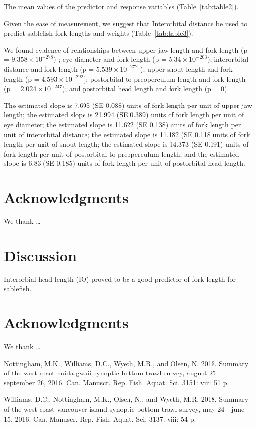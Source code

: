 \documentclass[12pt]{article}\usepackage[]{graphicx}\usepackage[]{color}
\begin{document}
The mean values of the predictor and response variables (Table~\ref{tab:table2}).

Given the ease of measurement, we suggest that Interorbital distance be used to predict sablefish fork lengths and weights (Table~\ref{tab:table3}).

We found evidence of relationships between upper jaw length and fork length (p = \ensuremath{9.358\times 10^{-278}}) ; eye diameter and fork length (p = \ensuremath{5.34\times 10^{-203}}); interorbital distance and fork length (p = \ensuremath{5.539\times 10^{-272}} ); upper snout length and fork length (p = \ensuremath{4.593\times 10^{-292}}); postorbital to preoperculum length and fork length (p = \ensuremath{2.024\times 10^{-247}}); and postorbital head length and fork length (p = 0).

The estimated slope is 7.695 (SE 0.088) units of fork length per unit of upper jaw length; the estimated slope is 21.994 (SE 0.389) units of fork length per unit of eye diameter; the estimated slope is 11.622 (SE 0.138) units of fork length per unit of interorbital distance; the estimated slope is 11.182 (SE 0.118 units of fork length per unit of snout length; the estimated slope is 14.373 (SE 0.191) units of fork length per unit of postorbital to preoperculum length; and the estimated slope is 6.83 (SE 0.185) units of fork length per unit of postorbital head length.

\hypertarget{acknowledgments}{%
\section{Acknowledgments}\label{acknowledgments}}

We thank \ldots{}

\hypertarget{discussion-1}{%
\section{Discussion}\label{discussion-1}}

Interorbial head length (IO) proved to be a good predictor of fork length for sablefish.

\hypertarget{acknowledgments-1}{%
\section{Acknowledgments}\label{acknowledgments-1}}

We thank \ldots{}

\hypertarget{refs}{}
\leavevmode\hypertarget{ref-Nottingham2018}{}%
Nottingham, M.K., Williams, D.C., Wyeth, M.R., and Olsen, N. 2018. Summary of the west coast haida gwaii synoptic bottom trawl survey, august 25 - september 26, 2016. Can. Manuscr. Rep. Fish. Aquat. Sci. 3151: viii: 51 p.

\leavevmode\hypertarget{ref-Williams2018}{}%
Williams, D.C., Nottingham, M.K., Olsen, N., and Wyeth, M.R. 2018. Summary of the west coast vancouver island synoptic bottom trawl survey, may 24 - june 15, 2016. Can. Manuscr. Rep. Fish. Aquat. Sci. 3137: viii: 54 p.
\end{document}
